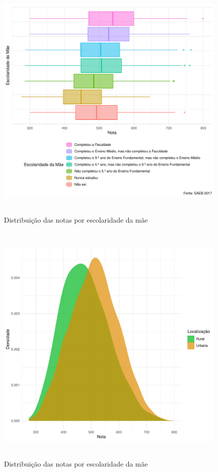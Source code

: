 \newpage
\begin{figure}[h]
    \caption{Distribuição das notas por escolaridade da mãe}
    \begin{center}
        \includegraphics[width=16cm,height=12cm]{img/esc_mae_notas.pdf}
    \end{center}
\end{figure}

\newpage

\begin{figure}[h]
    \caption{Distribuição das notas por escolaridade da mãe}
    \begin{center}
        \includegraphics[width=16cm,height=12cm]{img/loc_notas.pdf}
    \end{center}
\end{figure}

